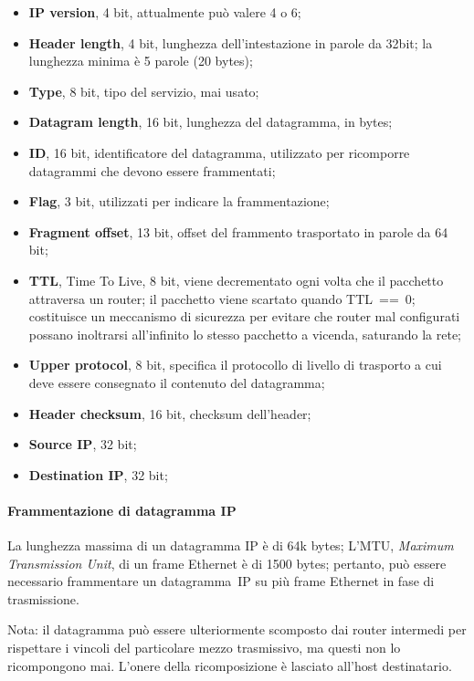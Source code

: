 \documentclass[12pt,a4paper]{article}
\begin{document}
\begin{itemize}
  \item \textbf{IP version}, 4 bit, attualmente può valere 4 o 6;
  \item \textbf{Header length}, 4 bit, lunghezza dell'intestazione in
    parole da 32bit; la lunghezza minima è 5 parole (20 bytes);
  \item \textbf{Type}, 8 bit, tipo del servizio, mai usato;
  \item \textbf{Datagram length}, 16 bit, lunghezza del datagramma,
    in bytes;
  \item \textbf{ID}, 16 bit, identificatore del datagramma, utilizzato
    per ricomporre datagrammi che devono essere frammentati;
  \item \textbf{Flag}, 3 bit, utilizzati per indicare la frammentazione;
  \item \textbf{Fragment offset}, 13 bit, offset del frammento trasportato
    in parole da 64 bit;
  \item \textbf{TTL}, Time To Live, 8 bit, viene decrementato ogni volta
    che il pacchetto attraversa un router; il pacchetto viene scartato
    quando TTL~==~0; costituisce un meccanismo di sicurezza per evitare
    che router mal configurati possano inoltrarsi all'infinito lo stesso
    pacchetto a vicenda, saturando la rete;
  \item \textbf{Upper protocol}, 8 bit, specifica il protocollo di livello
    di trasporto a cui deve essere consegnato il contenuto del datagramma;
  \item \textbf{Header checksum}, 16 bit, checksum dell'header;
  \item \textbf{Source IP}, 32 bit;
  \item \textbf{Destination IP}, 32 bit;
\end{itemize}

\paragraph{Frammentazione di datagramma IP}
La lunghezza massima di un datagramma IP è di 64k bytes;
L'MTU, \emph{Maximum Transmission Unit}, di un frame Ethernet è di 1500 bytes;
pertanto, può essere necessario frammentare un datagramma~IP su più frame
Ethernet in fase di trasmissione.

Nota: il datagramma può essere ulteriormente scomposto dai router
intermedi per rispettare i vincoli del particolare mezzo trasmissivo,
ma questi non lo ricompongono mai. L'onere della ricomposizione è
lasciato all'host destinatario.
\end{document}
